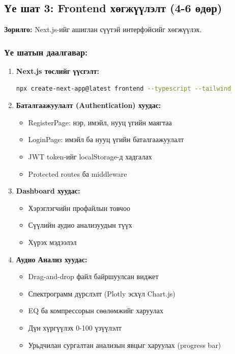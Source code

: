 \subsection{Үе шат 3: Frontend хөгжүүлэлт (4-6 өдөр)}

\textbf{Зорилго:} Next.js-ийг ашиглан сүүтэй интерфэйсийг хөгжүүлэх.

\subsubsection{Үе шатын даалгавар:}

\begin{enumerate}
    \item \textbf{Next.js төслийг үүсгэлт:}
    \begin{lstlisting}[language=bash]
    npx create-next-app@latest frontend --typescript --tailwind
    \end{lstlisting}
    
    \item \textbf{Баталгаажуулалт (Authentication) хуудас:}
    \begin{itemize}
        \item RegisterPage: нэр, имэйл, нууц үгийн маягтаа
        \item LoginPage: имэйл ба нууц үгийн баталгаажуулалт
        \item JWT token-ийг localStorage-д хадгалах
        \item Protected routes ба middleware
    \end{itemize}
    
    \item \textbf{Dashboard хуудас:}
    \begin{itemize}
        \item Хэрэглэгчийн профайлын товчоо
        \item Сүүлийн аудио анализуудын түүх
        \item Хүрэх мэдээлэл
    \end{itemize}
    
    \item \textbf{Аудио Анализ хуудас:}
    \begin{itemize}
        \item Drag-and-drop файл байршуулсан виджет
        \item Спектрограмм дүрслэлт (Plotly эсхүл Chart.js)
        \item EQ ба компрессорын сөөлөмжийг харуулах
        \item Дүн хүргүүлэх 0-100 үзүүлэлт
        \item Урьдчилан сургалтан анализын явцыг харуулах (progress bar)
    \end{itemize}
    

\end{enumerate}
